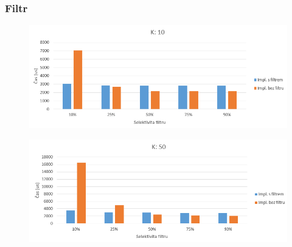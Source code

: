 \documentclass{beamer}
\begin{document}
	\begin{frame}
		\frametitle{Filtr}
		
		\begin{figure}
			\includegraphics[scale=0.4]{figures/graf_filtr_k10.png}
		\end{figure}
	
		\begin{figure}
			\includegraphics[scale=0.4]{figures/graf_filtr_k50.png}
		\end{figure}
		
	\end{frame}
\end{document}

